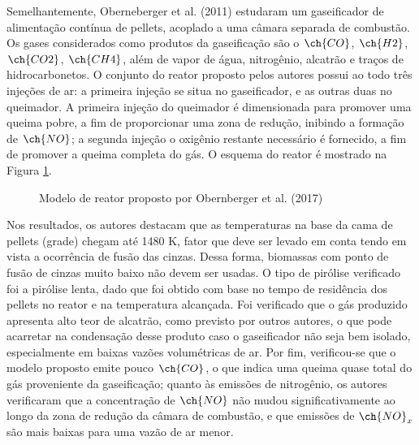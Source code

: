 Semelhantemente, Oberneberger et al. (2011) estudaram um gaseificador de alimentação contínua de pellets, acoplado a uma câmara separada de combustão. Os gases considerados como produtos da gaseificação são o $\ch{CO}$, $\ch{H2}$, $\ch{CO2}$, $\ch{CH4}$, além de vapor de água, nitrogênio, alcatrão e traços de hidrocarbonetos. O conjunto do reator proposto pelos autores possui ao todo três injeções de ar: a primeira injeção se situa no gaseificador, e as outras duas no queimador. A primeira injeção do queimador é dimensionada para promover uma queima pobre, a fim de proporcionar uma zona de redução, inibindo a formação de $\ch{NO}$; a segunda injeção o oxigênio restante necessário é fornecido, a fim de promover a queima completa do gás. O esquema do reator é mostrado na Figura \ref{fig:scharler}.

\begin{figure}[!ht]
	\centering
	\caption{Modelo de reator proposto por Obernberger et al. (2017)}
	\label{fig:scharler}
\end{figure}

Nos resultados, os autores destacam que as temperaturas na base da cama de pellets (grade) chegam até 1480 K, fator que deve ser levado em conta tendo em vista a ocorrência de fusão das cinzas. Dessa forma, biomassas com ponto de fusão de cinzas muito baixo não devem ser usadas. O tipo de pirólise verificado foi a pirólise lenta, dado que foi obtido com base no tempo de residência dos pellets no reator e na temperatura alcançada. Foi verificado que o gás produzido apresenta alto teor de alcatrão, como previsto por outros autores, o que pode acarretar na condensação desse produto caso o gaseificador não seja bem isolado, especialmente em baixas vazões volumétricas de ar. Por fim, verificou-se que o modelo proposto emite pouco $\ch{CO}$, o que indica uma queima quase total do gás proveniente da gaseificação; quanto às emissões de nitrogênio, os autores verificaram que a concentração de $\ch{NO}$ não mudou significativamente ao longo da zona de redução da câmara de combustão, e que emissões de $\ch{NO}_x$ são mais baixas para uma vazão de ar menor. 

